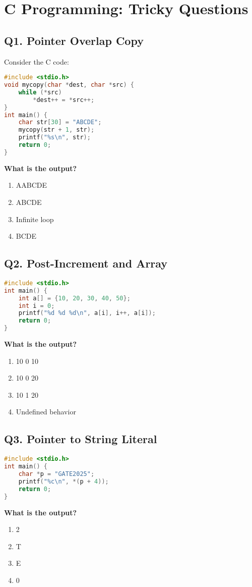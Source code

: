 \section{C Programming: Tricky Questions}

\subsection*{Q1. Pointer Overlap Copy}
\noindent
Consider the C code:
\begin{lstlisting}[language=C]
#include <stdio.h>
void mycopy(char *dest, char *src) {
    while (*src)
        *dest++ = *src++;
}
int main() {
    char str[30] = "ABCDE";
    mycopy(str + 1, str);
    printf("%s\n", str);
    return 0;
}
\end{lstlisting}
\textbf{What is the output?}
\begin{enumerate}[label=(\alph*)]
    \item AABCDE
    \item ABCDE
    \item Infinite loop
    \item BCDE
\end{enumerate}

\vspace{1em}
\subsection*{Q2. Post-Increment and Array}
\noindent
\begin{lstlisting}[language=C]
#include <stdio.h>
int main() {
    int a[] = {10, 20, 30, 40, 50};
    int i = 0;
    printf("%d %d %d\n", a[i], i++, a[i]);
    return 0;
}
\end{lstlisting}
\textbf{What is the output?}
\begin{enumerate}[label=(\alph*)]
    \item 10 0 10
    \item 10 0 20
    \item 10 1 20
    \item Undefined behavior
\end{enumerate}

\vspace{1em}
\subsection*{Q3. Pointer to String Literal}
\noindent
\begin{lstlisting}[language=C]
#include <stdio.h>
int main() {
    char *p = "GATE2025";
    printf("%c\n", *(p + 4));
    return 0;
}
\end{lstlisting}
\textbf{What is the output?}
\begin{enumerate}[label=(\alph*)]
    \item 2
    \item T
    \item E
    \item 0
\end{enumerate}


